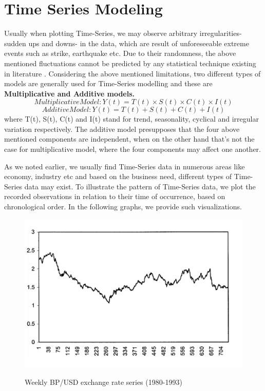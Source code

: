 \section{Time Series Modeling}
\par Usually when plotting Time-Series, we may observe arbitrary irregularities- sudden ups and downs- in the data, which are result of unforeseeable extreme events such as strike, earthquake etc. Due to their randomness, the above mentioned fluctuations cannot be predicted by any statistical technique existing in literature \cite{madsen2007time}. Considering the above mentioned limitations, two different types of models are generally used for Time-Series modelling and these are \textbf{Multiplicative and Additive models.}
$$Multiplicative Model: Y(t) = T(t)× S(t)×C(t)× I(t)$$
$$Additive Model: Y(t) = T(t) + S(t) + C(t) + I(t)$$ 
where T(t), S(t), C(t) and I(t) stand for trend, seasonality, cyclical and irregular variation respectively. The additive model presupposes that the four above mentioned components are independent, when on the other hand that's not the case for multiplicative model, where the four components may affect one another.
\par
As we noted earlier, we usually find Time-Series data in numerous areas like economy, industry etc and based on the business need, different types of Time-Series data may exist. To illustrate the pattern of Time-Series data, we plot the recorded observations in relation to their time of occurrence, based on chronological order. In the following graphs, we provide such visualizations. 
\begin{figure}[htbp]
\centering
\includegraphics[width=0.8\linewidth]{project/fd.PNG}
\label{fig:felix}
\caption{Weekly BP/USD exchange rate series (1980-1993)}
\end{figure}
